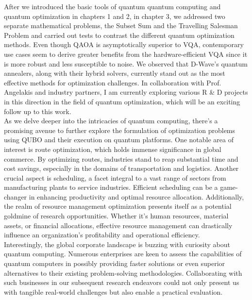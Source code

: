 \documentclass[12pt,a4paper]{report}
\begin{document}
\noindent
After we introduced the basic tools of quantum quantum computing and quantum optimization in chapters 1 and 2, in chapter 3, we addressed two separate mathematical problems, the Subset Sum and the Travelling Salesman Problem and carried out tests to contrast the different quantum optimization methods. Even though QAOA is asymptotically superior to VQA, contemporary use cases seem to derive greater benefits from the hardware-efficient VQA since it is more robust and less susceptible to noise. We observed that D-Wave’s quantum annealers, along with their hybrid solvers, currently stand out as the most effective methods for optimization challenges. In collaboration with Prof. Angelakis and industry partners, I am currently exploring various R \& D projects in this direction in the field of quantum optimization, which will be an exciting follow up to this work.
\\

\noindent
As we delve deeper into the intricacies of quantum computing, there's a promising avenue to further explore the formulation of optimization problems using QUBO and their execution on quantum platforms. One notable area of interest is route optimization, which holds immense significance in global commerce. By optimizing routes, industries stand to reap substantial time and cost savings, especially in the domains of transportation and logistics. Another crucial aspect is scheduling, a facet integral to a vast range of sectors from manufacturing plants to service industries. Efficient scheduling can be a game-changer in enhancing productivity and optimal resource allocation. Additionally, the realm of resource management optimization presents itself as a potential goldmine of research opportunities. Whether it's human resources, material assets, or financial allocations, effective resource management can drastically influence an organization's profitability and operational efficiency.
\\

\noindent
Interestingly, the global corporate landscape is buzzing with curiosity about quantum computing. Numerous enterprises are keen to assess the capabilities of quantum computers in possibly providing faster solutions or even superior alternatives to their existing problem-solving methodologies. Collaborating with such businesses in our subsequent research endeavors could not only present us with tangible real-world challenges but also enable a practical evaluation.
\\
\end{document}
